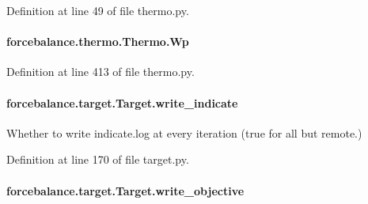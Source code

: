 Definition at line 49 of file thermo.\-py.

\hypertarget{classforcebalance_1_1thermo_1_1Thermo_ace1a9dd4cc6b80f40a10d56309b30a01}{
\paragraph[{Wp}]{\setlength{\rightskip}{0pt plus 5cm}forcebalance.\-thermo.\-Thermo.\-Wp\hspace{0.3cm}{\ttfamily [inherited]}}}\label{classforcebalance_1_1thermo_1_1Thermo_ace1a9dd4cc6b80f40a10d56309b30a01}


Definition at line 413 of file thermo.\-py.

\hypertarget{classforcebalance_1_1target_1_1Target_a3a2f5d4bbb8d6ecb580eadb261977a57}{
\paragraph[{write\-\_\-indicate}]{\setlength{\rightskip}{0pt plus 5cm}forcebalance.\-target.\-Target.\-write\-\_\-indicate\hspace{0.3cm}{\ttfamily [inherited]}}}\label{classforcebalance_1_1target_1_1Target_a3a2f5d4bbb8d6ecb580eadb261977a57}


Whether to write indicate.\-log at every iteration (true for all but remote.) 



Definition at line 170 of file target.\-py.

\hypertarget{classforcebalance_1_1target_1_1Target_a7a95624dfe03f0cee0e5f1ae09db306a}{
\paragraph[{write\-\_\-objective}]{\setlength{\rightskip}{0pt plus 5cm}forcebalance.\-target.\-Target.\-write\-\_\-objective\hspace{0.3cm}{\ttfamily [inherited]}}}\label{classforcebalance_1_1target_1_1Target_a7a95624dfe03f0cee0e5f1ae09db306a}


